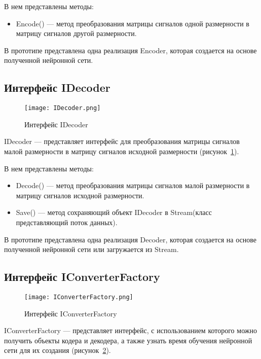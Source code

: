 В нем представлены методы:
\begin{itemize}
  \item Encode() --- метод преобразования матрицы сигналов одной размерности в матрицу сигналов другой размерности.
\end{itemize}

В прототипе представлена одна реализация Encoder, которая создается на основе полученной нейронной сети.

\subsection{Интерфейс IDecoder}
\label{subsub:development:idecoder}

\begin{figure}[ht]
\centering
  \texttt{[image: IDecoder.png]}
  \caption{ Интерфейс IDecoder }
  \label{fig:idecoder}
\end{figure}
IDecoder --- представляет интерфейс для преобразования матрицы сигналов малой размерности в матрицу сигналов исходной размерности (рисунок~\ref{fig:idecoder}).

В нем представлены методы:
\begin{itemize}
  \item Decode() --- метод преобразования матрицы сигналов малой размерности в матрицу сигналов исходной размерности.
  \item Save() --- метод сохраняющий объект IDecoder в Stream(класс представляющий поток данных).
\end{itemize}

В прототипе представлена одна реализация Decoder, которая создается на основе полученной нейронной сети или загружается из Stream.

\subsection{Интерфейс IConverterFactory}
\label{subsub:development:iconverterfactory}

\begin{figure}[ht]
\centering
  \texttt{[image: IConverterFactory.png]}
  \caption{ Интерфейс IConverterFactory }
  \label{fig:iconverterfactory}
\end{figure}
IConverterFactory --- представляет интерфейс, с использованием которого можно получить объекты кодера и декодера,
а также узнать время обучения нейронной сети для их создания (рисунок~\ref{fig:iconverterfactory}).

